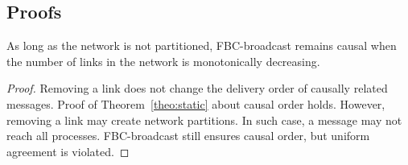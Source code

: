 \subsection{Proofs}

\begin{theorem}
\end{theorem}

\begin{theorem}
  As long as the network is not partitioned, FBC-broadcast remains causal when
  the number of links in the network is monotonically decreasing.
\end{theorem}

\begin{proof}
  Removing a link does not change the delivery order of causally related
  messages. Proof of Theorem~\ref{theo:static} about causal order holds.
  However, removing a link may create network partitions. In such case, a
  message may not reach all processes. FBC-broadcast still ensures causal order,
  but uniform agreement is violated.
\end{proof}


%     

%     

